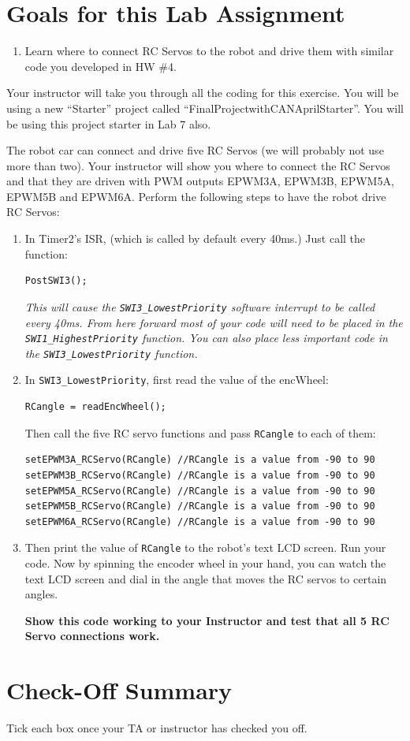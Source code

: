 \documentclass[11pt]{article}
\begin{document}
\MakeAssignmentTitle

\section*{Goals for this Lab Assignment}
%
\begin{enumerate}
    \item Learn where to connect RC Servos to the robot and drive them with similar code you developed in HW \#4.
\end{enumerate}
%

Your instructor will take you through all the coding for this exercise. You will be using a new “Starter” project called “FinalProjectwithCANAprilStarter”. You will be using this project starter in Lab 7 also.

The robot car can connect and drive five RC Servos (we will probably not use more than two). Your instructor will show you where to connect the RC Servos and that they are driven with PWM outputs EPWM3A, EPWM3B, EPWM5A, EPWM5B and EPWM6A. Perform the following steps to have the robot drive RC Servos:
%
\begin{enumerate}
    \item In Timer2’s ISR, (which is called by default every 40ms.) Just call the function:
\begin{verbatim}
PostSWI3();
\end{verbatim}
        {\itshape This will cause the \texttt{SWI3_LowestPriority} software interrupt to be called every 40ms. From here forward most of your code will need to be placed in the \texttt{SWI1_HighestPriority} function. You can also place less important code in the \texttt{SWI3_LowestPriority} function.}
        \item In \texttt{SWI3_LowestPriority}, first read the value of the encWheel:
\begin{verbatim}
RCangle = readEncWheel();
\end{verbatim}
        Then call the five RC servo functions and pass \texttt{RCangle} to each of them:
\begin{verbatim}
setEPWM3A_RCServo(RCangle) //RCangle is a value from -90 to 90
setEPWM3B_RCServo(RCangle) //RCangle is a value from -90 to 90
setEPWM5A_RCServo(RCangle) //RCangle is a value from -90 to 90
setEPWM5B_RCServo(RCangle) //RCangle is a value from -90 to 90
setEPWM6A_RCServo(RCangle) //RCangle is a value from -90 to 90
\end{verbatim}
        \item Then print the value of \texttt{RCangle} to the robot’s text LCD screen. Run your code. Now by spinning the encoder wheel in your hand, you can watch the text LCD screen and dial in the angle that moves the RC servos to certain angles.
        \begin{checkoff}
                \textbf{Show this code working to your Instructor and test that all 5 RC Servo connections work.}
        \end{checkoff}
\end{enumerate}
%
\section*{Check-Off Summary}

Tick each box once your TA or instructor has checked you off.
%
\CheckOffSummary

\MakeFooter
\end{document}
